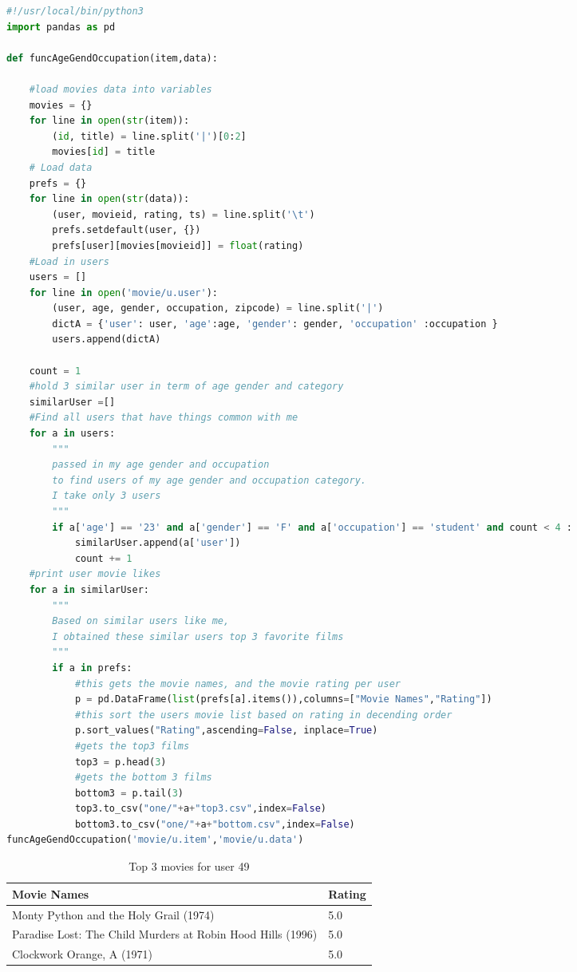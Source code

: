 \documentclass[12pt]{article}
\begin{document}
\begin{lstlisting}[language=Python, caption=one.py , label=1st:copy]
#!/usr/local/bin/python3
import pandas as pd

def funcAgeGendOccupation(item,data):

    #load movies data into variables
    movies = {}
    for line in open(str(item)):
        (id, title) = line.split('|')[0:2]
        movies[id] = title
    # Load data
    prefs = {}
    for line in open(str(data)):
        (user, movieid, rating, ts) = line.split('\t')
        prefs.setdefault(user, {})
        prefs[user][movies[movieid]] = float(rating)
    #Load in users
    users = []
    for line in open('movie/u.user'):
        (user, age, gender, occupation, zipcode) = line.split('|')
        dictA = {'user': user, 'age':age, 'gender': gender, 'occupation' :occupation }
        users.append(dictA)
    
    count = 1
    #hold 3 similar user in term of age gender and category
    similarUser =[]
    #Find all users that have things common with me 
    for a in users:
        """
        passed in my age gender and occupation
        to find users of my age gender and occupation category.
        I take only 3 users
        """
        if a['age'] == '23' and a['gender'] == 'F' and a['occupation'] == 'student' and count < 4 :
            similarUser.append(a['user'])
            count += 1
    #print user movie likes
    for a in similarUser:
        """
        Based on similar users like me,
        I obtained these similar users top 3 favorite films 
        """
        if a in prefs:
            #this gets the movie names, and the movie rating per user
            p = pd.DataFrame(list(prefs[a].items()),columns=["Movie Names","Rating"])
            #this sort the users movie list based on rating in decending order
            p.sort_values("Rating",ascending=False, inplace=True)
            #gets the top3 films
            top3 = p.head(3)
            #gets the bottom 3 films
            bottom3 = p.tail(3)
            top3.to_csv("one/"+a+"top3.csv",index=False)
            bottom3.to_csv("one/"+a+"bottom.csv",index=False)
funcAgeGendOccupation('movie/u.item','movie/u.data')


\end{lstlisting}

\begin{table}[ht]
\centering
\caption{Top 3 movies for user 49}
\label{tbl}
\begin{tabular}{|l|l|}
\hline
\textbf{Movie Names} & \textbf{Rating} \\ \hline \hline
Monty Python and the Holy Grail (1974) & 5.0   \\ \hline
Paradise Lost: The Child Murders at Robin Hood Hills (1996) & 5.0   \\ \hline
Clockwork Orange, A (1971) & 5.0  \\ \hline
\end{tabular}
\end{table}
\end{document}
